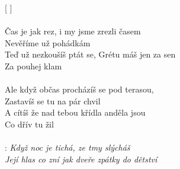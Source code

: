 [    ]\\
\\

Čas je jak rez, i my jsme zrezli časem\\
Nevěříme už pohádkám\\
Teď už nezkoušíš ptát se, Grétu máš jen za sen\\
Za pouhej klam\\
\\
Ale když občas procházíš se pod terasou,\\
Zastavíš se tu na pár chvil\\
A cítíš že nad tebou křídla anděla jsou\\
Co dřív tu žil\\
\\
\textregistered:
\emph{
  Když noc je tichá, ze tmy slýcháš\\
  Její hlas co zní jak dveře zpátky do dětství\\
\\
}

\newpage
